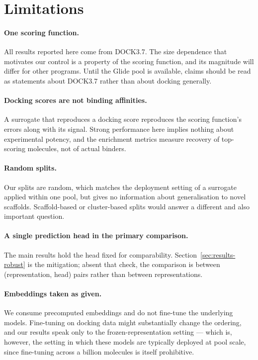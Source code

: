 \section{Limitations}
\label{sec:limitations}

\paragraph{One scoring function.}
All results reported here come from DOCK3.7. The size dependence that motivates
our control is a property of the scoring function, and its magnitude will
differ for other programs. Until the Glide pool is available, claims should be
read as statements about DOCK3.7 rather than about docking generally.

\paragraph{Docking scores are not binding affinities.}
A surrogate that reproduces a docking score reproduces the scoring function's
errors along with its signal. Strong performance here implies nothing about
experimental potency, and the enrichment metrics measure recovery of
top-scoring molecules, not of actual binders.

\paragraph{Random splits.}
Our splits are random, which matches the deployment setting of a surrogate
applied within one pool, but gives no information about generalisation to
novel scaffolds. Scaffold-based or cluster-based splits would answer a
different and also important question.

\paragraph{A single prediction head in the primary comparison.}
The main results hold the head fixed for comparability.
Section~\ref{sec:results-robust} is the mitigation; absent that check, the
comparison is between (representation, head) pairs rather than between
representations.

\paragraph{Embeddings taken as given.}
We consume precomputed embeddings and do not fine-tune the underlying models.
Fine-tuning on docking data might substantially change the ordering, and our
results speak only to the frozen-representation setting --- which is, however,
the setting in which these models are typically deployed at pool scale, since
fine-tuning across a billion molecules is itself prohibitive.


